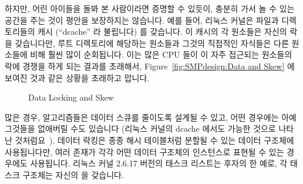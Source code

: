 하지만, 어린 아이들을 돌봐 본 사람이라면 증명할 수 있듯이, 충분히 가서 놀 수
있는 공간을 주는 것이 평안을 보장하지는 않습니다.
예를 들어, 리눅스 커널은 파일과 디렉토리들의 캐시 (``dcache'' 라 불립니다) 를
갖습니다.
이 캐시의 각 원소들은 자신의 락을 갖습니다만, 루트 디렉토리에 해당하는 원소들과
그것의 직접적인 자식들은 다른 원소들에 비해 훨씬 많이 순회됩니다.
이는 많은 CPU 들이 이 자주 접근되는 원소들의 락에 경쟁을 하게 되는 결과를
초래해서, Figure~\ref{fig:SMPdesign:Data and Skew} 에 보여진 것과 같은 상황을
초래하고 맙니다.

\begin{figure}[tbh]
\centering
{}
\caption{Data Locking and Skew}
\end{figure}

많은 경우, 알고리즘들은 데이터 스큐를 줄이도록 설계될 수 있고, 어떤 경우에는
아예 그것들을 없애버릴 수도 있습니다 (리눅스 커널의 dcache 에서도 가능한 것으로
나타난 것처럼요~\cite{McKenney04a}).
데이터 락킹은 종종 해시 테이블처럼 분할될 수 있는 데이터 구조체에 사용됩니다만,
여러 존재가 각각 어떤 데이터 구조체의 인스턴스로 표현될 수 있는 경우에도
사용됩니다.
리눅스 커널 2.6.17 버전의 태스크 리스트는 후자의 한 예로, 각 태스크 구조체는
자신의  을 갖습니다.

